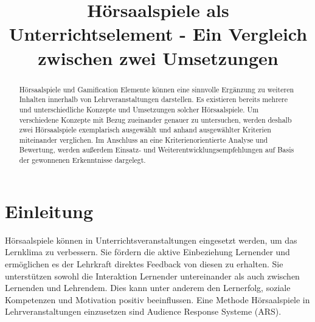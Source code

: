 \documentclass[conference]{IEEEtran}
\begin{document}
\title{Hörsaalspiele als Unterrichtselement - Ein Vergleich zwischen zwei Umsetzungen}

\author{
}

\maketitle

\begin{abstract}
Hörsaalspiele und Gamification Elemente können eine sinnvolle Ergänzung zu weiteren Inhalten innerhalb von Lehrveranstaltungen darstellen. Es existieren bereits mehrere und unterschiedliche Konzepte und Umsetzungen solcher Hörsaalspiele. Um verschiedene Konzepte mit Bezug zueinander genauer zu untersuchen, werden deshalb zwei Hörsaalspiele exemplarisch ausgewählt und anhand ausgewählter Kriterien miteinander verglichen. Im Anschluss an eine Kriterienorientierte Analyse und Bewertung, werden außerdem Einsatz- und Weiterentwicklungsempfehlungen auf Basis der gewonnenen Erkenntnisse dargelegt.
\end{abstract}


\section{Einleitung}
Hörsaalspiele können in Unterrichtsveranstaltungen eingesetzt werden, um das Lernklima zu verbessern. Sie fördern die aktive Einbeziehung Lernender und ermöglichen es der Lehrkraft direktes Feedback von diesen zu erhalten. Sie unterstützen sowohl die Interaktion Lernender untereinander als auch zwischen Lernenden und Lehrendem. Dies kann unter anderem den Lernerfolg, soziale Kompetenzen und Motivation positiv beeinflussen. \cite[S. 368]{Lehmann2014} Eine Methode Hörsaalspiele in Lehrveranstaltungen einzusetzen sind Audience Response Systeme (ARS). 
\end{document}
